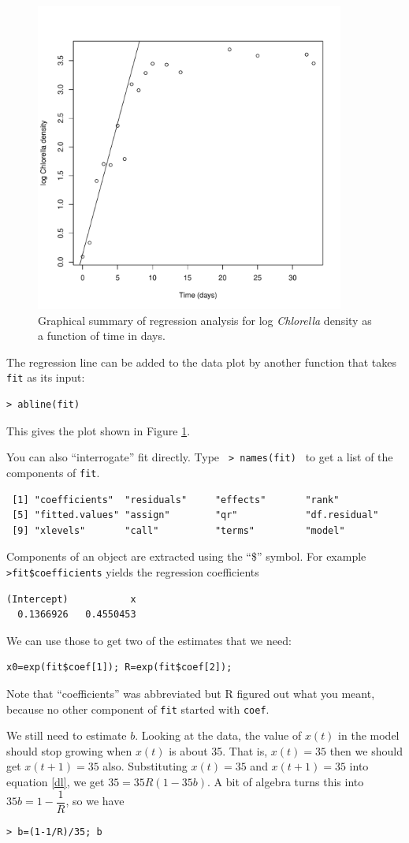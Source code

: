 \documentclass [11pt]{article}
\newcommand{\blst}{\vspace{-0.035in} \begin{lstlisting}}
\newcommand{\ttt}[1]{\texttt{#1}}
\numberwithin{exercise}{section}
\def\R{R }
\begin{document}
\begin{figure}[t]
\centerline{\includegraphics[width=4in]{figures/Session1Fig1.pdf}}
\caption{\small{Graphical summary of regression analysis for log \textit{Chlorella} density as
a function of time in days.}}
\label{Session1.Fig1}
\end{figure}

The regression line can be added to the data plot by 
another function that takes \texttt{fit} as its input: 
\blst
> abline(fit)
\end{lstlisting}
This gives the plot shown in Figure \ref{Session1.Fig1}. 

You can also ``interrogate'' fit directly. Type 
\verb! > names(fit) ! to get a list of the components of \texttt{fit}. 
\blst
 [1] "coefficients"  "residuals"     "effects"       "rank"         
 [5] "fitted.values" "assign"        "qr"            "df.residual"  
 [9] "xlevels"       "call"          "terms"         "model" 
\end{lstlisting}
Components of an object are extracted using the ``\$'' symbol. For
example \texttt{>fit\$coefficients} yields the regression 
coefficients 
\blst
(Intercept)           x 
  0.1366926   0.4550453 
\end{lstlisting}
We can use those to get two of the estimates that we need:
\blst
x0=exp(fit$coef[1]); R=exp(fit$coef[2]); 
\end{lstlisting}
Note that ``coefficients'' was abbreviated but \R figured out what you meant,
because no other component of \ttt{fit} started with \ttt{coef}.  

We still need to estimate $b$. Looking at the data, the value of $x(t)$ in the model 
should stop growing when $x(t)$ is about 35. That is, $x(t)=35$ then we should get $x(t+1)=35$ also. 
Substituting $x(t)=35$ and $x(t+1)=35$ into equation \eqref{dl}, we get $35=35R(1-35b).$ A bit
of algebra turns this into $35b=1-\dfrac{1}{R}$, so we have
\blst
> b=(1-1/R)/35; b 
\end{lstlisting} 
\end{document}

